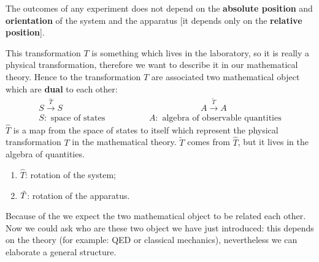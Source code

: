 \documentclass[../main.tex]{subfiles}
\begin{document}
\begin{assumption} The outcomes of any experiment does not depend on the \textbf{absolute position} and \textbf{orientation} of the system and the apparatus [it depends only on the \textbf{relative position}].
\end{assumption}
This transformation $T$ is something which lives in the laboratory, so it is really a physical transformation, therefore we want to describe it in our mathematical theory. Hence to the transformation $T$ are associated two mathematical object which are \textbf{dual} to each other:
\begin{align*}
    S \xrightarrow{\hat{T}} S \quad \qquad  \qquad & \qquad \qquad \qquad \qquad A \xrightarrow{\tilde{T}} A\\
    S: \textrm{ space of states } \qquad & \qquad A: \textrm{ algebra of observable quantities}
\end{align*}
$\hat{T}$ is a  map from the space of states to itself which represent the physical transformation $T$ in the mathematical theory. $\tilde{T}$ comes from $\hat{T}$, but it lives in the algebra of quantities.
\begin{enumerate}
    \item $\hat{T}$: rotation of the system;
    \item $\Tilde{T}$: rotation of the apparatus.
\end{enumerate}
Because of the  we expect the two mathematical object to be related each other. Now we could ask who are these two object we have just introduced: this depends on the theory (for example: QED or classical mechanics), nevertheless we can elaborate a general structure.
\end{document}
